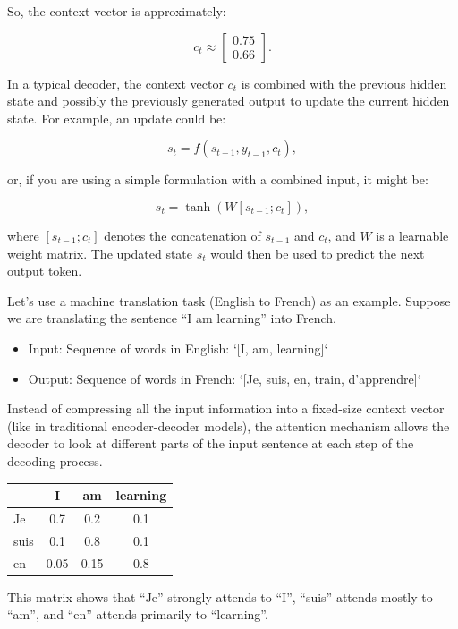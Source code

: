 So, the context vector is approximately:

\[
c_t \approx \begin{bmatrix} 0.75 \\ 0.66 \end{bmatrix}.
\]

In a typical decoder, the context vector \( c_t \) is combined with the previous hidden state and possibly the previously generated output to update the current hidden state. For example, an update could be:

\[
s_t = f(s_{t-1}, y_{t-1}, c_t),
\]

or, if you are using a simple formulation with a combined input, it might be:

\[
s_t = \tanh(W [s_{t-1}; c_t]),
\]

where \( [s_{t-1}; c_t] \) denotes the concatenation of \( s_{t-1} \) and \( c_t \), and \( W \) is a learnable weight matrix. The updated state \( s_t \) would then be used to predict the next output token.

Let's use a machine translation task (English to French) as an example. Suppose we are translating the sentence ``I am learning'' into French. 
\begin{itemize}
	\item Input: Sequence of words in English: `[I, am, learning]`
	\item Output: Sequence of words in French: `[Je, suis, en, train, d'apprendre]`
\end{itemize}

Instead of compressing all the input information into a fixed-size context vector (like in traditional encoder-decoder models), the attention mechanism allows the decoder to look at different parts of the input sentence at each step of the decoding process.

\begin{table}[h]
\centering
\begin{tabular}{lccc}
\toprule
& I & am & learning \\
\midrule
Je   & 0.7  & 0.2  & 0.1 \\
suis & 0.1  & 0.8  & 0.1 \\
en   & 0.05 & 0.15 & 0.8 \\
\bottomrule
\end{tabular}
\end{table}

This matrix shows that ``Je'' strongly attends to ``I'', ``suis'' attends mostly to ``am'', and ``en'' attends primarily to ``learning''.

